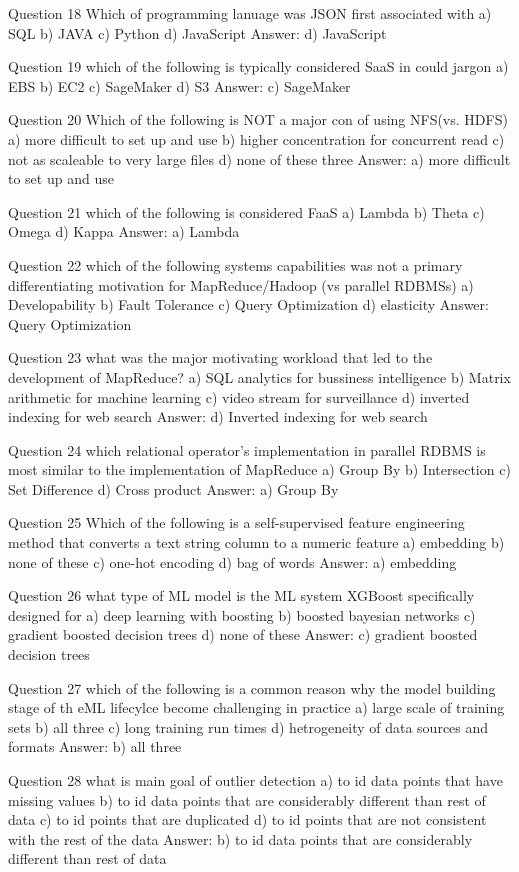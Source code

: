 Question 18
Which of programming lanuage was JSON first associated with
a) SQL
b) JAVA
c) Python
d) JavaScript
Answer: d) JavaScript

Question 19
which of the following is typically considered SaaS in could jargon
a) EBS
b) EC2
c) SageMaker
d) S3
Answer: c) SageMaker

Question 20
Which of the following is NOT a major con of using NFS(vs. HDFS)
a) more difficult to set up and use
b) higher concentration for concurrent read
c) not as scaleable to very large files
d) none of these three
Answer: a) more difficult to set up and use

Question 21
which of the following is considered FaaS
a) Lambda
b) Theta
c) Omega
d) Kappa
Answer: a) Lambda

Question 22
which of the following systems capabilities was not a primary differentiating motivation for MapReduce/Hadoop (vs parallel RDBMSs)
a) Developability
b) Fault Tolerance
c) Query Optimization
d) elasticity
Answer: Query Optimization

Question 23
what was the major motivating workload that led to the development of MapReduce?
a) SQL analytics for bussiness intelligence
b) Matrix arithmetic for machine learning
c) video stream for surveillance
d) inverted indexing for web search
Answer: d) Inverted indexing for web search

Question 24
which relational operator's implementation in parallel RDBMS is most similar to the implementation of MapReduce
a) Group By
b) Intersection
c) Set Difference
d) Cross product
Answer: a) Group By

Question 25
Which of the following is a self-supervised feature engineering method that converts a text string column to a numeric feature
a) embedding
b) none of these
c) one-hot encoding
d) bag of words
Answer: a) embedding

Question 26
what type of ML model is the ML system XGBoost specifically designed for
a) deep learning with boosting
b) boosted bayesian networks
c) gradient boosted decision trees
d) none of these
Answer: c) gradient boosted decision trees

Question 27
which of the following is a common reason why the model building stage of th eML lifecylce become challenging in practice
a) large scale of training sets
b) all three
c) long training run times
d) hetrogeneity of data sources and formats
Answer: b) all three

Question 28
what is main goal of outlier detection
a) to id data points that have missing values
b) to id data points that are considerably different than rest of data
c) to id points that are duplicated
d) to id points that are not consistent with the rest of the data
Answer: b) to id data points that are considerably different than rest of data

